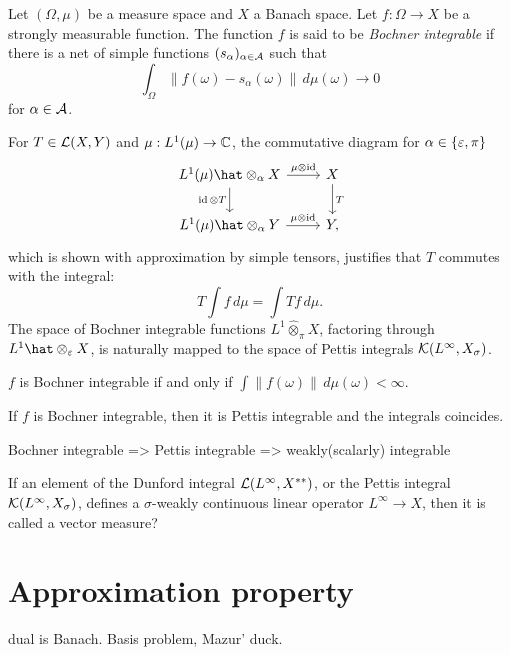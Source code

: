 \documentclass{../../large}
\begin{document}
\begin{prb}
Let $(\Omega,\mu)$ be a measure space and $X$ a Banach space.
Let $f:\Omega\to X$ be a strongly measurable function.
The function $f$ is said to be \emph{Bochner integrable} if there is a net of simple functions $(s_\alpha)_{\alpha\in\mathcal{A}}$ such that
\[\int_\Omega\|f(\omega)-s_\alpha(\omega)\|\,d\mu(\omega)\to0\]
for $\alpha\in\mathcal{A}$.

For $T\in\mathcal{L}(X,Y)$ and $\mu:L^1(\mu)\to\mathbb{C}$, the commutative diagram for $\alpha\in\{\varepsilon,\pi\}$
\[\begin{tikzcd}
L^1(\mu)\hat\otimes_\alpha X \dar[swap]{\id\otimes T}\rar{\mu\otimes\id} & X \dar{T}\\
L^1(\mu)\hat\otimes_\alpha Y \rar{\mu\otimes\id} & Y,
\end{tikzcd}\]
which is shown with approximation by simple tensors, justifies that $T$ commutes with the integral:
\[T\int f\,d\mu=\int Tf\,d\mu.\]
The space of Bochner integrable functions $L^1\hat\otimes_\pi X$, factoring through $L^1\hat\otimes_\e X$, is naturally mapped to the space of Pettis integrals $\mathcal{K}(L^\infty,X_\sigma)$.
\begin{parts}
\item $f$ is Bochner integrable if and only if $\int\|f(\omega)\|\,d\mu(\omega)<\infty$.
\item If $f$ is Bochner integrable, then it is Pettis integrable and the integrals coincides.
\end{parts}
Bochner integrable => Pettis integrable => weakly(scalarly) integrable
\end{prb}


\begin{prb}
If an element of the Dunford integral $\mathcal{L}(L^\infty,X^{**})$, or the Pettis integral $\mathcal{K}(L^\infty,X_\sigma)$, defines a $\sigma$-weakly continuous linear operator $L^\infty\to X$, then it is called a vector measure?
\end{prb}






\section{Approximation property}
dual is Banach.
Basis problem, Mazur' duck.
\end{document}
